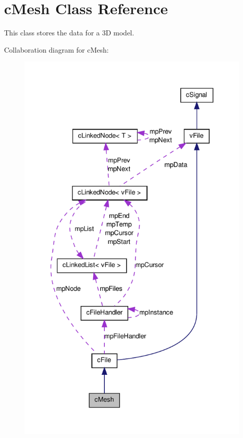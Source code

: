 \hypertarget{classc_mesh}{
\section{cMesh Class Reference}
\label{classc_mesh}
}


This class stores the data for a 3D model.  




Collaboration diagram for cMesh:\nopagebreak
\begin{figure}[H]
\begin{center}
\leavevmode
\includegraphics[width=325pt]{classc_mesh__coll__graph}
\end{center}
\end{figure}
